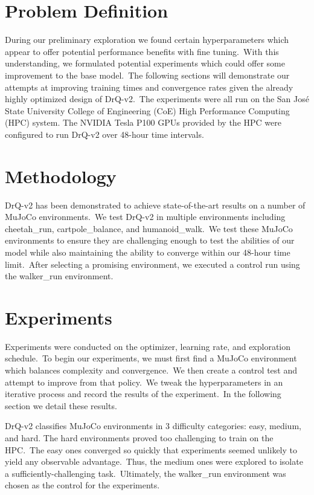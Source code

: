 \documentclass[conference]{./IEEEtran/IEEEtran} %
\begin{document}
    \section{Problem Definition}\label{sec:problem-definition}

    During our preliminary exploration we found certain hyperparameters which appear to offer potential performance benefits with fine tuning.\ With
    this understanding, we formulated potential experiments which could offer some improvement to the base model.\ The following sections will demonstrate our attempts at improving
    training times and convergence rates given the already highly optimized design of DrQ-v2.\ The experiments were all
    run on the San Jos\'e State University College of Engineering (CoE) High Performance Computing (HPC) system.
    The NVIDIA Tesla P100 GPUs provided by the HPC were configured to run DrQ-v2 over 48-hour time intervals.

    \section{Methodology}\label{sec:methodology}

    DrQ-v2 has been demonstrated to achieve state-of-the-art results on a number of MuJoCo environments.\ We test DrQ-v2 in multiple
    environments including cheetah\_run, cartpole\_balance, and humanoid\_walk.\ We test these MuJoCo environments to ensure they
    are challenging enough to test the abilities of our model while also maintaining the ability to converge within our 48-hour
    time limit.\ After selecting a promising environment, we executed a control run using the walker\_run environment.

    \section{Experiments}\label{sec:experiments}

    Experiments were conducted on the optimizer, learning rate, and exploration schedule.\ To begin our experiments, we must first find a MuJoCo
    environment which balances complexity and convergence.\ We then create a control test and attempt to improve from that policy.\
    We tweak the hyperparameters in an iterative process and record the results of the experiment.\ In the following section we
    detail these results.

    DrQ-v2 classifies MuJoCo environments in 3 difficulty categories: easy, medium, and hard.
    The hard environments proved too challenging to train on the HPC.\ The easy ones converged so quickly that
    experiments seemed unlikely to yield any observable advantage.\ Thus, the medium ones were explored to isolate a
    sufficiently-challenging task.\ Ultimately, the walker\_run environment was chosen as the control for the experiments.
\end{document}
